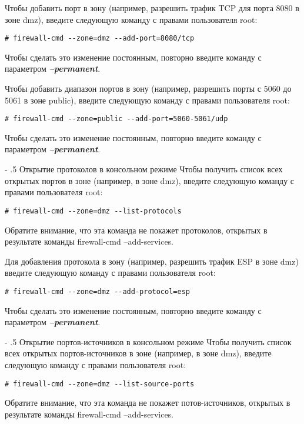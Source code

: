 \documentclass[a4paper,10pt,twoside]{article}
\makeatletter
\renewcommand\paragraph{%
   \@startsection{paragraph}{4}{0mm}%
      {-\baselineskip}%
      {.5\baselineskip}%
      {\normalfont\normalsize\bfseries}}
\makeatother
\begin{document}
Чтобы добавить порт в зону (например, разрешить трафик TCP для порта 8080 в зоне dmz), введите следующую команду с правами пользователя root: 
\begin{verbatim}
# firewall-cmd --zone=dmz --add-port=8080/tcp
\end{verbatim} 
Чтобы сделать это изменение постоянным, повторно введите команду с параметром \textit{\textbf{--permanent}}.

Чтобы добавить диапазон портов в зону (например, разрешить порты с 5060 до 5061 в зоне public), введите следующую команду с правами пользователя root: 
\begin{verbatim}
# firewall-cmd --zone=public --add-port=5060-5061/udp
\end{verbatim} 
Чтобы сделать это изменение постоянным, повторно введите команду с параметром \textit{\textbf{--permanent}}. 


\paragraph{Открытие протоколов в консольном режиме}
Чтобы получить список всех открытых портов в зоне (например, в зоне dmz), введите следующую команду  с правами пользователя root: 
\begin{verbatim}
# firewall-cmd --zone=dmz --list-protocols
\end{verbatim} 
Обратите внимание, что эта команда не покажет протоколов, открытых в результате команды firewall-cmd --add-services.

Для добавления протокола в зону (например, разрешить трафик ESP в зоне dmz) введите следующую команду с правами пользователя root: 
\begin{verbatim}
# firewall-cmd --zone=dmz --add-protocol=esp
\end{verbatim} 
Чтобы сделать это изменение постоянным, повторно введите команду с параметром \textit{\textbf{--permanent}}. 


\paragraph{Открытие портов-источников в консольном режиме}
Чтобы получить список всех открытых портов-источников в зоне (например, в зоне dmz), введите следующую команду с правами пользователя root: 
\begin{verbatim}
# firewall-cmd --zone=dmz --list-source-ports
\end{verbatim} 
Обратите внимание, что эта команда не покажет потов-источников, открытых в результате команды firewall-cmd --add-services.
\end{document}
